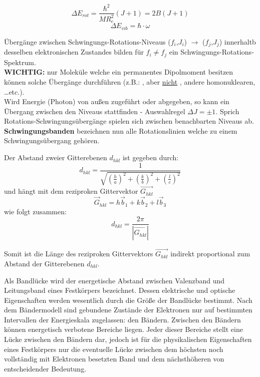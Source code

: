 \[\Delta E_{rot} = \frac{\hbar^2}{M R_e^2}(J+1) = 2B(J+1)\]
\[\Delta E_{vib} = \hbar \cdot \omega\]

\label{q:3}

Übergänge zwischen Schwingungs-Rotations-Niveaus ($f_i$,$J_i$) $\rightarrow$ ($f_j$,$J_j$) innerhaltb desselben elektronischen Zustandes bilden für $f_i \neq f_j$ ein Schwingungs-Rotations-Spektrum. \\

\textbf{WICHTIG:} nur Moleküle welche ein permanentes Dipolmoment besitzen können solche Übergänge durchführen (z.B.: ,  aber \underline{nicht} , andere homonuklearen, \dots etc.). \\

Wird Energie (Photon) von außen zugeführt oder abgegeben, so kann ein Übergang zwischen den Niveaus stattfinden - Auswahlregel $\Delta J = \pm 1$. Sprich Rotations-Schwingungsübergänge spielen sich zwischen benachbarten Niveaus ab.\\

\textbf{Schwingungsbanden} bezeichnen nun alle Rotationslinien welche zu einem Schwingungsübergang gehören. \\


\label{q:4}

Der Abstand zweier Gitterebenen $d_{hkl}$ ist gegeben durch:
\[d_{hkl} = \frac{1}{\sqrt{\left(\frac{h}{a}\right)^2 + \left(\frac{k}{b}\right)^2 + \left(\frac{l}{c}\right)^2}}\]
und hängt mit dem reziproken Gittervektor $\vec{G_{hkl}}$ 
\[\vec{G}_{hkl} = h\vec{b}_1 + k\vec{b}_2 + l\vec{b}_3\]
wie folgt zusammen:
\[d_{hkl} = \frac{2\pi}{|\vec{G_{hkl}}|}\]

Somit ist die Länge des reziproken Gittervektors $\vec{G_{hkl}}$ indirekt proportional zum Abstand der Gitterebenen $d_{hkl}$.

\label{q:5}

Als Bandlücke wird der energetische Abstand zwischen Valenzband und Leitungsband eines Festkörpers bezeichnet. Dessen elektrische und optische Eigenschaften werden wesentlich durch die Größe der Bandlücke bestimmt.
Nach dem Bändermodell sind gebundene Zustände der Elektronen nur auf bestimmten Intervallen der Energieskala zugelassen: den Bändern. Zwischen den Bändern können energetisch verbotene Bereiche liegen. Jeder dieser Bereiche stellt eine Lücke zwischen den Bändern dar, jedoch ist für die physikalischen Eigenschaften eines Festkörpers nur die eventuelle Lücke zwischen dem höchsten noch vollständig mit Elektronen besetzten Band und dem nächsthöheren von entscheidender Bedeutung.

